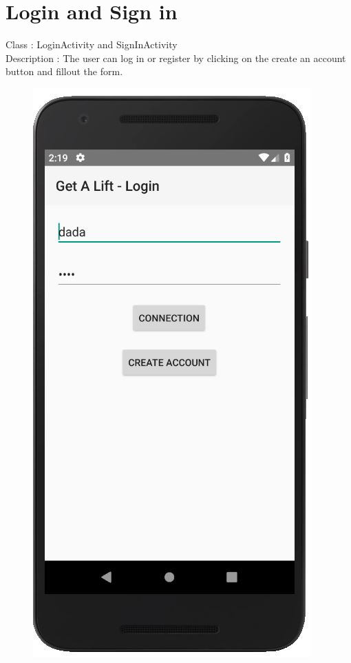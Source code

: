 \newpage
\section{Login and Sign in}
Class : LoginActivity and SignInActivity \\
Description :  The user can log in or register by clicking on the create an account button and fillout the form.\newline

\begin{figure}[h!]
   \begin{minipage}[b]{0.48\linewidth}
      \centering \includegraphics[scale = 0.8]{diagrams/login_page.jpg}

\end{minipage}
\end{figure}
